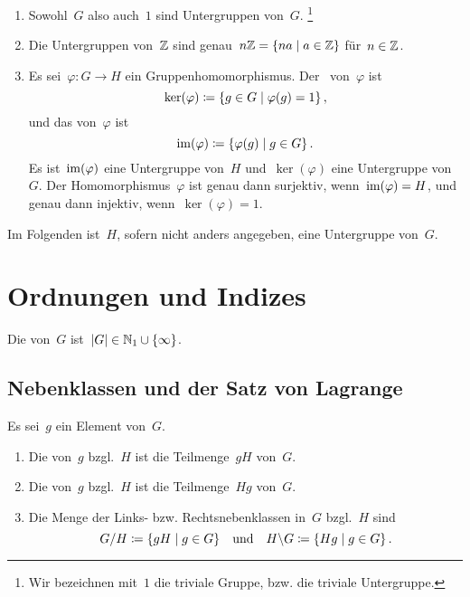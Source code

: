 \begin{example}
  \leavevmode
  \begin{enumerate}
    \item
      Sowohl~$G$ also auch~$1$ sind Untergruppen von~$G$.%
      \footnote{
        Wir bezeichnen mit~$1$ die triviale Gruppe, bzw. die triviale Untergruppe.
      }
    \item
      Die Untergruppen von~$\mathbb{Z}$ sind genau~$n \Integer = \{na \suchthat a \in \Integer\}$ für~$n \in \mathbb{Z}$.
    \item
      Es sei~$\varphi \colon G \to H$ ein Gruppenhomomorphismus.
      Der~ von~$\varphi$ ist
      \[
        \ker(\varphi)
        \defined
        \{
          g \in G
        \suchthat
          \varphi(g) = 1
        \} \,,
      \]
      und das  von~$\varphi$ ist
      \[
        \im(\varphi)
        \defined
        \{
          \varphi(g)
        \suchthat
          g \in G
        \} \,.
      \]
      Es ist~$\operatorname{im}(\varphi)$ eine Untergruppe von~$H$ und~$\ker(\varphi)$ eine Untergruppe von~$G$.
      Der Homomorphismus~$\varphi$ ist genau dann surjektiv, wenn~$\operatorname{im}(\varphi) = H$, und genau dann injektiv, wenn~$\ker(\varphi) = 1$.
  \end{enumerate}
\end{example}

\begin{convention}
  Im Folgenden ist~$H$, sofern nicht anders angegeben, eine Untergruppe von~$G$.
\end{convention}





\section{Ordnungen und Indizes}

\begin{definition}
  Die  von~$G$ ist~$\lvert G\rvert \in \mathbb{N}_{1} \cup \{ \infty \}$.
\end{definition}



\subsection{Nebenklassen und der Satz von Lagrange}

\begin{definition}
  Es sei~$g$ ein Element von~$G$.
  \begin{enumerate}
    \item
      Die  von~$g$ bzgl.~$H$ ist die Teilmenge~$gH$ von~$G$.
    \item
      Die  von~$g$ bzgl.~$H$ ist die Teilmenge~$Hg$ von~$G$.
    \item
      Die Menge der Links- bzw. Rechtsnebenklassen in~$G$ bzgl.~$H$ sind
      \[
        G/H \defined \{ gH \suchthat g \in G \}
        \quad\text{und}\quad
        H \backslash G \defined \{ Hg \suchthat g \in G \} \,.
      \]
  \end{enumerate}
\end{definition}

